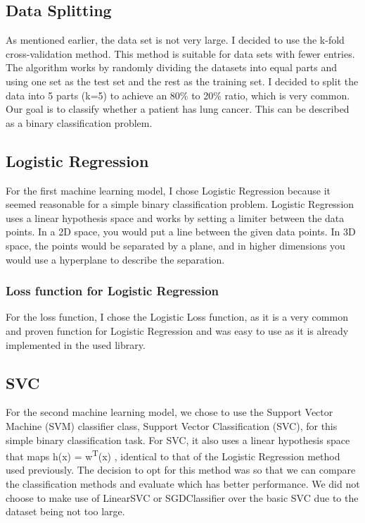 \documentclass[a4paper,12pt]{article}
\begin{document}
\subsection{Data Splitting}
\label{sec:org41842fb}
As mentioned earlier, the data set is not very large.
I decided to use the k-fold cross-validation method. This method is suitable for data sets with fewer entries.
The algorithm works by randomly dividing the datasets into equal parts and using one set as the test set and the rest as the training set.
I decided to split the data into 5 parts (k=5) to achieve an 80\% to 20\% ratio, which is very common.
Our goal is to classify whether a patient has lung cancer. This can be described as a binary classification problem.

\subsection{Logistic Regression}
\label{sec:org2e44365}
For the first machine learning model, I chose Logistic Regression because it seemed reasonable for a simple binary classification problem.
Logistic Regression uses a linear hypothesis space and works by setting a limiter between the data points.
In a 2D space, you would put a line between the given data points. In 3D space, the points would be separated by a plane, and in higher dimensions you would use a hyperplane to describe the separation.

\subsubsection{Loss function for Logistic Regression}
\label{sec:orga493106}
For the loss function, I chose the Logistic Loss function, as it is a very common and proven function for Logistic Regression and was easy to use as it is already implemented in the used library.






\subsection{SVC}
\label{sec:org033f42e}
For the second machine learning model, we chose to use the Support Vector Machine (SVM) classifier class, Support Vector Classification (SVC), for this simple binary classification task. For SVC, it also uses a linear hypothesis space that maps h(x) = w\textsuperscript{T}(x) , identical to that of the Logistic Regression method used previously. The decision to opt for this method was so that we can compare the classification methods and evaluate which has better performance. We did not choose to make use of LinearSVC or SGDClassifier over the basic SVC due to the dataset being not too large.
\end{document}
